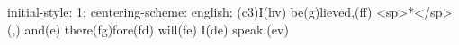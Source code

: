 initial-style: 1;
centering-scheme: english;
(c3)I(hv) be(g)lieved,(ff) <sp>*</sp>(,) and(e) there(fg)fore(fd) will(fe) I(de) speak.(ev)
